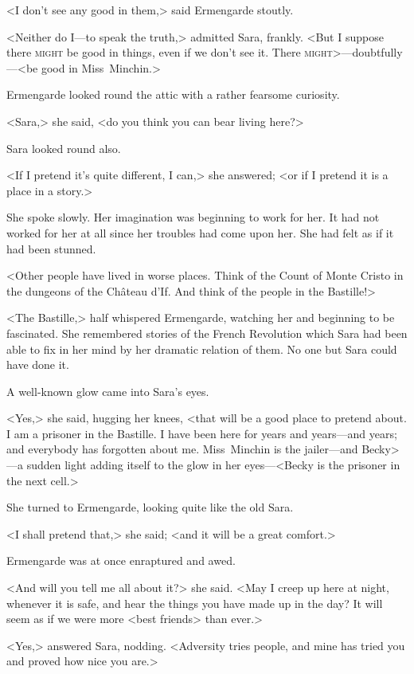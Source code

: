 <I don't see any good in them,> said Ermengarde stoutly.

<Neither do I—to speak the truth,> admitted Sara, frankly. <But I suppose there \textsc{might} be good in things, even if we don't see it. There \textsc{might}>—doubtfully—<be good in Miss~Minchin.>

Ermengarde looked round the attic with a rather fearsome curiosity.

<Sara,> she said, <do you think you can bear living here?>

Sara looked round also.

<If I pretend it's quite different, I can,> she answered; <or if I pretend it is a place in a story.>

She spoke slowly. Her imagination was beginning to work for her. It had not worked for her at all since her troubles had come upon her. She had felt as if it had been stunned.

<Other people have lived in worse places. Think of the Count of Monte Cristo in the dungeons of the Château d'If. And think of the people in the Bastille!>

<The Bastille,> half whispered Ermengarde, watching her and beginning to be fascinated. She remembered stories of the French Revolution which Sara had been able to fix in her mind by her dramatic relation of them. No one but Sara could have done it.

A well-known glow came into Sara's eyes.

<Yes,> she said, hugging her knees, <that will be a good place to pretend about. I am a prisoner in the Bastille. I have been here for years and years—and years; and everybody has forgotten about me. Miss~Minchin is the jailer—and Becky>—a sudden light adding itself to the glow in her eyes—<Becky is the prisoner in the next cell.>

She turned to Ermengarde, looking quite like the old Sara.

<I shall pretend that,> she said; <and it will be a great comfort.>

Ermengarde was at once enraptured and awed.

<And will you tell me all about it?> she said. <May I creep up here at night, whenever it is safe, and hear the things you have made up in the day? It will seem as if we were more <best friends> than ever.>

<Yes,> answered Sara, nodding. <Adversity tries people, and mine has tried you and proved how nice you are.>